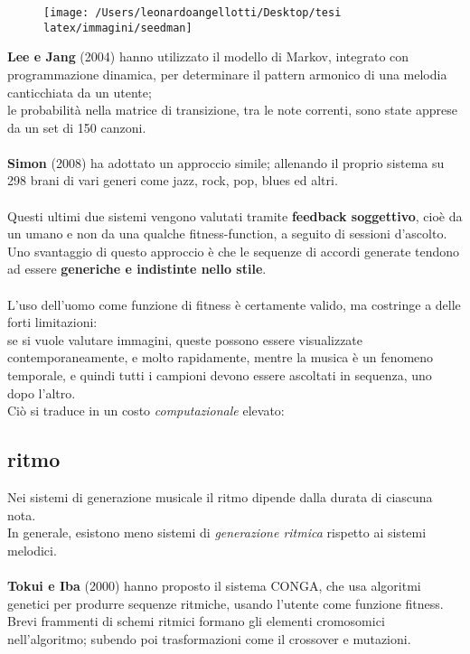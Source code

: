 \documentclass[a4paper,12pt]{report}
\begin{document}
\begin{figure}[H]
    \centering
    \texttt{[image: /Users/leonardoangellotti/Desktop/tesi latex/immagini/seedman]} 
    \label{fig:immagine16}
\end{figure}

\textbf{Lee e Jang} (2004) hanno utilizzato il modello di Markov, integrato con programmazione dinamica, per determinare il pattern armonico di una melodia canticchiata da un utente; \\
le probabilità nella matrice di transizione, tra le note correnti, sono state apprese da un set di 150 canzoni. \\
\\
\textbf{Simon} (2008) ha adottato un approccio simile; allenando il proprio sistema su 298 brani di vari generi come jazz, rock, pop, blues ed altri. \\
\\
Questi ultimi due sistemi vengono valutati tramite \textbf{feedback soggettivo}, cioè da un umano e non da una qualche fitness-function, a seguito di sessioni d'ascolto. \\
Uno svantaggio di questo approccio è che le sequenze di accordi generate tendono ad essere \textbf{generiche e indistinte nello stile}. \\
\\
L'uso dell'uomo come funzione di fitness è certamente valido, ma costringe a delle forti limitazioni: \\
se si vuole valutare immagini, queste possono essere visualizzate contemporaneamente, e molto rapidamente, 
mentre la musica è un fenomeno temporale, e quindi tutti i campioni devono essere ascoltati in sequenza, uno dopo l'altro. \\
Ciò si traduce in un costo \textit{computazionale} elevato:

\subsection{ritmo}

Nei sistemi di generazione musicale il ritmo dipende dalla durata di ciascuna nota. \\
In generale, esistono meno sistemi di \textit{generazione ritmica} rispetto ai sistemi melodici. \\
\\
\textbf{Tokui e Iba} (2000) hanno proposto il sistema CONGA, che usa algoritmi genetici per produrre sequenze ritmiche, usando l'utente come funzione fitness. \\
Brevi frammenti di schemi ritmici formano gli elementi cromosomici nell'algoritmo; subendo poi trasformazioni come il crossover e mutazioni. 
\end{document}
